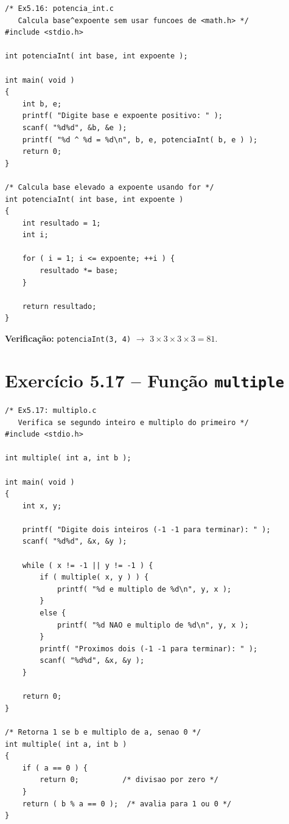 \documentclass[12pt,a4paper]{article}
\begin{document}
\begin{respostabox}
\begin{lstlisting}
/* Ex5.16: potencia_int.c
   Calcula base^expoente sem usar funcoes de <math.h> */
#include <stdio.h>

int potenciaInt( int base, int expoente );

int main( void )
{
    int b, e;
    printf( "Digite base e expoente positivo: " );
    scanf( "%d%d", &b, &e );
    printf( "%d ^ %d = %d\n", b, e, potenciaInt( b, e ) );
    return 0;
}

/* Calcula base elevado a expoente usando for */
int potenciaInt( int base, int expoente )
{
    int resultado = 1;
    int i;

    for ( i = 1; i <= expoente; ++i ) {
        resultado *= base;
    }

    return resultado;
}
\end{lstlisting}

\textbf{Verificação:} \texttt{potenciaInt(3, 4)} $\to$ $3 \times 3 \times 3 \times 3 = 81$.
\end{respostabox}

\newpage

\section{Exercício 5.17 -- Função \texttt{multiple}}

\begin{respostabox}
\begin{lstlisting}
/* Ex5.17: multiplo.c
   Verifica se segundo inteiro e multiplo do primeiro */
#include <stdio.h>

int multiple( int a, int b );

int main( void )
{
    int x, y;

    printf( "Digite dois inteiros (-1 -1 para terminar): " );
    scanf( "%d%d", &x, &y );

    while ( x != -1 || y != -1 ) {
        if ( multiple( x, y ) ) {
            printf( "%d e multiplo de %d\n", y, x );
        }
        else {
            printf( "%d NAO e multiplo de %d\n", y, x );
        }
        printf( "Proximos dois (-1 -1 para terminar): " );
        scanf( "%d%d", &x, &y );
    }

    return 0;
}

/* Retorna 1 se b e multiplo de a, senao 0 */
int multiple( int a, int b )
{
    if ( a == 0 ) {
        return 0;          /* divisao por zero */
    }
    return ( b % a == 0 );  /* avalia para 1 ou 0 */
}
\end{lstlisting}
\end{respostabox}
\end{document}

